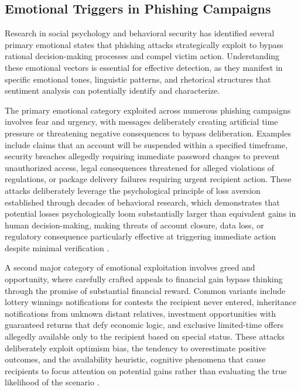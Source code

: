 \subsection{Emotional Triggers in Phishing Campaigns}

Research in social psychology and behavioral security has identified several primary emotional states that phishing attacks strategically exploit to bypass rational decision-making processes and compel victim action. Understanding these emotional vectors is essential for effective detection, as they manifest in specific emotional tones, linguistic patterns, and rhetorical structures that sentiment analysis can potentially identify and characterize.

The primary emotional category exploited across numerous phishing campaigns involves fear and urgency, with messages deliberately creating artificial time pressure or threatening negative consequences to bypass deliberation. Examples include claims that an account will be suspended within a specified timeframe, security breaches allegedly requiring immediate password changes to prevent unauthorized access, legal consequences threatened for alleged violations of regulations, or package delivery failures requiring urgent recipient action. These attacks deliberately leverage the psychological principle of loss aversion established through decades of behavioral research, which demonstrates that potential losses psychologically loom substantially larger than equivalent gains in human decision-making, making threats of account closure, data loss, or regulatory consequence particularly effective at triggering immediate action despite minimal verification \cite{wash2020understanding}.

A second major category of emotional exploitation involves greed and opportunity, where carefully crafted appeals to financial gain bypass thinking through the promise of substantial financial reward. Common variants include lottery winnings notifications for contests the recipient never entered, inheritance notifications from unknown distant relatives, investment opportunities with guaranteed returns that defy economic logic, and exclusive limited-time offers allegedly available only to the recipient based on special status. These attacks deliberately exploit optimism bias, the tendency to overestimate positive outcomes, and the availability heuristic, cognitive phenomena that cause recipients to focus attention on potential gains rather than evaluating the true likelihood of the scenario \cite{modic2012willing}.

